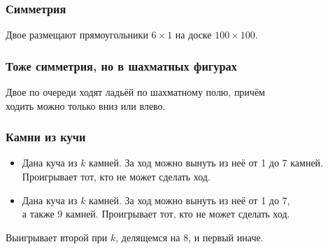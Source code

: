 \begin{frame} \frametitle{Симметрия}
	Двое размещают прямоугольники $6 \times 1$ на доске $100 \times 100$. \medskip \pause

\begin{center}  \end{center}
\end{frame}

\begin{frame} \frametitle{Тоже симметрия, но в шахматных фигурах}
	Двое по очереди ходят ладьёй по шахматному полю, причём \\
	ходить можно только вниз или влево. \medskip \pause

\begin{center}  \end{center}
\end{frame}

\begin{frame} \frametitle{Камни из кучи}
\begin{itemize} \itemsep=4mm
	\item Дана куча из $k$ камней. За ход можно вынуть из неё от 1 до 7 камней. Проигрывает тот, кто не может сделать ход.
	\item Дана куча из $k$ камней. За ход можно вынуть из неё от 1 до 7, \\ а также 9 камней. Проигрывает тот, кто не может сделать ход.
\end{itemize} \bigskip \pause

Выигрывает второй при $k$, делящемся на 8, и первый иначе.
\end{frame}
